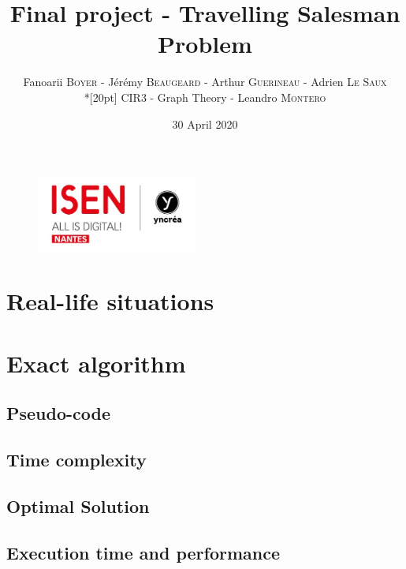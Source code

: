 \documentclass[a4paper, 12pt]{report}
\title{Final project - Travelling Salesman Problem}
\author{Fanoarii \textsc{Boyer} - Jérémy \textsc{Beaugeard} - Arthur \textsc{Guerineau} - Adrien \textsc{Le Saux} \\*[20pt] CIR3 - Graph Theory - Leandro \textsc{Montero}}
\date{30 April 2020}
\begin{document}
	\begin{titlepage}
		\begin{figure}
			\begin{center}
				\includegraphics[width=150pt]{isen.png}
				\maketitle
			\end{center}
		\end{figure}
	\end{titlepage}

	\tableofcontents
	
	\chapter{Real-life situations}
	
	\chapter{Exact algorithm}
		\section{Pseudo-code}
		
		\begin{algorithm}
			\SetAlgoLined
		\end{algorithm}
		
		\section{Time complexity}
		\section{Optimal Solution}
		\section{Execution time and performance}
	
\end{document}
